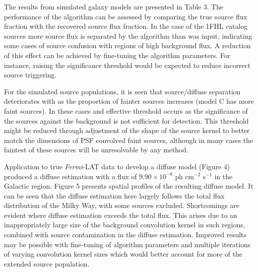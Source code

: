 \documentclass{PoS}
\begin{document}
The results from simulated galaxy models are presented in Table 3. The performance of the algorithm can be assessed by comparing the true source flux fraction with the recovered source flux fraction. In the case of the 1FHL catalog sources more source flux is separated by the algorithm than was input, indicating some cases of source confusion with regions of high background flux. A reduction of this effect can be achieved by fine-tuning the algorithm parameters. For instance, raising the significance threshold would be expected to reduce incorrect source triggering.

For the simulated source populations, it is seen that source/diffuse separation deteriorates with as the proportion of fainter sources increases (model C has more faint sources). In these cases and effective threshold occurs as the significance of the sources against the background is not sufficient for detection. This threshold might be reduced through adjustment of the shape of the source kernel to better match the dimensions of PSF convolved faint sources, although in many cases the faintest of these sources will be unresolvable by any method.

\begin{table}
\centering
{}
\makeatletter
\def\@captype{table}
\makeatother
\caption{Galactic Plane recovered diffuse fluxes}
\vspace{-20pt}
\end{table}

Application to true \textit{Fermi}-LAT data to develop a diffuse model (Figure 4) produced a diffuse estimation with a flux of $9.90 \times 10^{-8}$ ph cm$^{-2}$ s$^{-1}$ in the Galactic region. Figure 5 presents spatial profiles of the resulting diffuse model. It can be seen that the diffuse estimation here largely follows the total flux distribution of the Milky Way, with some sources excluded. Shortcomings are evident where diffuse estimation exceeds the total flux. This arises due to an inappropriately large size of the background convolution kernel in such regions, combined with source contamination in the diffuse estimation. Improved results may be possible with fine-tuning of algorithm parameters and multiple iterations of varying convolution kernel sizes which would better account for more of the extended source population.
\end{document}
